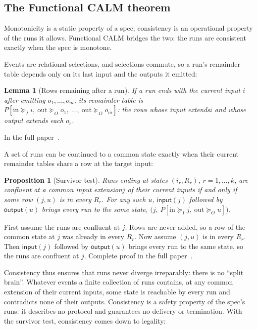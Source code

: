 \documentclass[sigconf]{cidr-2027}
\makeatletter
\newtheorem{proposition}{Proposition}
\newtheorem{lemma}{Lemma}
\theoremstyle{remark}
\newcommand{\InputGe}{\succeq_I}
\newcommand{\OutputGe}{\succeq_O}
\newcommand{\inrel}{extends\xspace}          %
\newcommand{\indesc}{input extension\xspace} %
\newcommand{\outrel}{extends\xspace}          %
\newcommand{\fullproof}{Complete proof in the full paper~\cite{hellerstein2026completecalmfull}.}
\newcommand{\proofinfull}{\par\pushQED{\qed}\normalfont\topsep2\p@\relax
  \trivlist\item[\@proofindent\hskip\labelsep{\@proofnamefont\proofname\@addpunct{.}}]%
  \ignorespaces In the full paper~\cite{hellerstein2026completecalmfull}.%
  \popQED\endtrivlist\@endpefalse}
\renewenvironment{proof}[1][\proofname]{\par
  \pushQED{\qed}\normalfont\topsep2\p@\relax
  \trivlist\item[\@proofindent\hskip\labelsep{\@proofnamefont #1\@addpunct{.}}]\ignorespaces
}{\popQED\endtrivlist\@endpefalse}
\makeatother
\begin{document}
\subsection{The Functional CALM theorem}
\label{sec:functional-calm-theorem}

Monotonicity is a
static property of a spec; consistency is an operational property
of the runs it allows.  Functional CALM bridges the two: the runs are consistent exactly when
the spec is monotone.

Events are
relational selections, and selections commute, so a run's remainder table
depends only on its last input and the outputs it emitted:

\begin{lemma}[Rows remaining after a run]
\label{lem:run-residual}
If a run ends with the current input $i$ after emitting
$o_1,\ldots,o_m$, its remainder table is \(P[\mathrm{in}\InputGe i,\ \mathrm{out}\OutputGe o_1,\ \ldots,\
  \mathrm{out}\OutputGe o_m]\): the rows whose input \inrel $i$ and whose
output \outrel each $o_r$.
\end{lemma}
\proofinfull

A set of runs can be continued to a common state exactly when their current
remainder tables share a row at the target input:

\begin{proposition}[Survivor test]
\label{prop:confluence}
Runs ending at states $(i_r,R_r)$, $r=1,\ldots,k$, are confluent at a common
\indesc $j$ of their current inputs if and only if some row $(j,u)$ is in every
$R_r$.  For any such $u$, $\mathsf{input}(j)$ followed by $\mathsf{output}(u)$
brings every run to the same state,
$\bigl(j,\ P[\mathrm{in}\InputGe j,\ \mathrm{out}\OutputGe u]\bigr)$.
\end{proposition}

\begin{proof}[Proof sketch]
First assume the runs are confluent at $j$.  Rows are never added, so a row of
the common state at $j$ was already in every $R_r$.  Now assume $(j,u)$ is in
every $R_r$.  Then $\mathsf{input}(j)$ followed by $\mathsf{output}(u)$ brings
every run to the same state, so the runs are confluent at $j$.  \fullproof
\end{proof}

Consistency thus ensures that runs never diverge irreparably: there is no
``split brain''.  Whatever events a finite collection of runs contains, at any common extension of their current inputs, some state is reachable by every run
and contradicts none of their outputs.  Consistency is a safety property of the spec's runs:
it describes no protocol and guarantees no delivery or termination.  With the survivor test, consistency comes down to legality:
\end{document}
